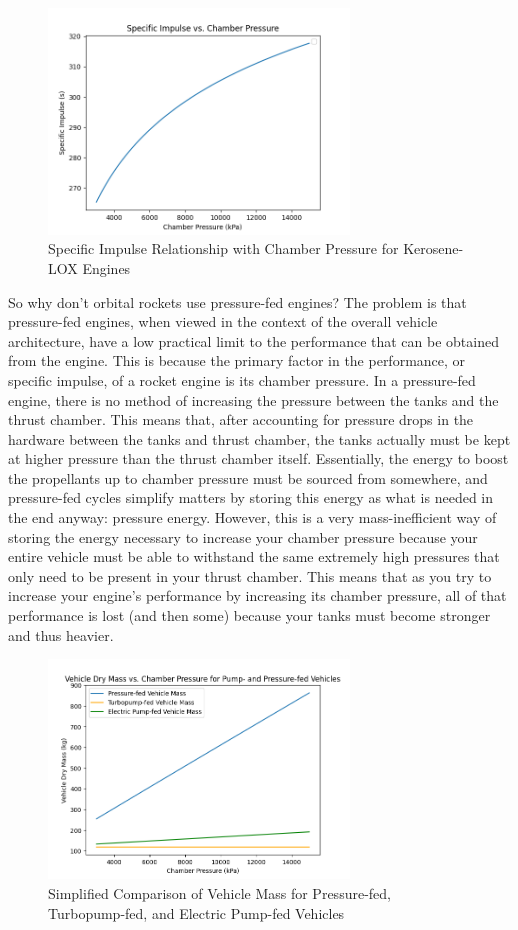 \documentclass[12pt, letterpaper]{article}
\begin{document}
\newpage

\begin{figure}[!t]
    \centering
    \includegraphics[width=8cm]{Plots and Graphs/Pc_V_Isp.png}
    \caption{Specific Impulse Relationship with Chamber Pressure for Kerosene-LOX Engines}
\end{figure}

So why don't orbital rockets use pressure-fed engines? The problem is that pressure-fed engines, when viewed in the context of the overall vehicle architecture, have a low practical limit to the performance that can be obtained from the engine. This is because the primary factor in the performance, or specific impulse, of a rocket engine is its chamber pressure. In a pressure-fed engine, there is no method of increasing the pressure between the tanks and the thrust chamber. This means that, after accounting for pressure drops in the hardware between the tanks and thrust chamber, the tanks actually must be kept at higher pressure than the thrust chamber itself. Essentially, the energy to boost the propellants up to chamber pressure must be sourced from somewhere, and pressure-fed cycles simplify matters by storing this energy as what is needed in the end anyway: pressure energy. However, this is a very mass-inefficient way of storing the energy necessary to increase your chamber pressure because your entire vehicle must be able to withstand the same extremely high pressures that only need to be present in your thrust chamber. This means that as you try to increase your engine's performance by increasing its chamber pressure, all of that performance is lost (and then some) because your tanks must become stronger and thus heavier. 

\begin{figure}[!b]
    \centering
    \includegraphics[width=8cm]{Plots and Graphs/VehicleMass_V_Pc.png}
    \caption{Simplified Comparison of Vehicle Mass for Pressure-fed, Turbopump-fed, and Electric Pump-fed Vehicles}
\end{figure}
\end{document}
